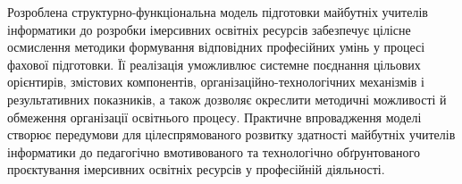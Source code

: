 Розроблена структурно-функціональна модель підготовки майбутніх учителів інформатики до розробки імерсивних освітніх ресурсів забезпечує цілісне осмислення методики формування відповідних професійних умінь у процесі фахової підготовки. Її реалізація уможливлює системне поєднання цільових орієнтирів, змістових компонентів, організаційно-технологічних механізмів і результативних показників, а також дозволяє окреслити методичні можливості й обмеження організації освітнього процесу. Практичне впровадження моделі створює передумови для цілеспрямованого розвитку здатності майбутніх учителів інформатики до педагогічно вмотивованого та технологічно обґрунтованого проєктування імерсивних освітніх ресурсів у професійній діяльності.
